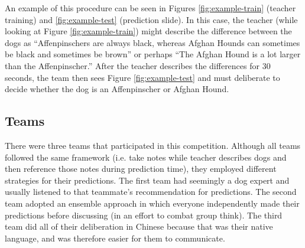 \documentclass[sigplan,10pt]{acmart}
\begin{document}
An example of this procedure can be seen in Figures \ref{fig:example-train} (teacher training) and \ref{fig:example-test} (prediction slide). In this case, the teacher (while looking at Figure \ref{fig:example-train}) might describe the difference between the dogs as ``Affenpinschers are always black, whereas Afghan Hounds can sometimes be black and sometimes be brown'' or perhaps ``The Afghan Hound is a lot larger than the Affenpinscher.'' After the teacher describes the differences for 30 seconds, the team then sees Figure \ref{fig:example-test} and must deliberate to decide whether the dog is an Affenpinscher or Afghan Hound.


\subsection{Teams}

There were three teams that participated in this competition. Although all teams followed the same framework (i.e. take notes while teacher describes dogs and then reference those notes during prediction time), they employed different strategies for their predictions. The first team had seemingly a dog expert and usually listened to that teammate's recommendation for predictions. The second team adopted an ensemble approach in which everyone independently made their predictions before discussing (in an effort to combat group think). The third team did all of their deliberation in Chinese because that was their native language, and was therefore easier for them to communicate.
\end{document}
